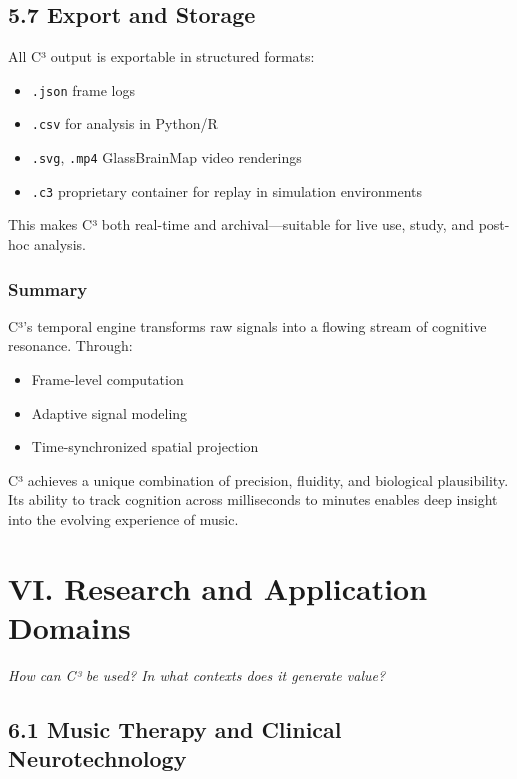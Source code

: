 \documentclass[10pt]{article}
\begin{document}
\subsection*{5.7 Export and Storage}

All C³ output is exportable in structured formats:

\begin{itemize}
    \item \texttt{.json} frame logs
    \item \texttt{.csv} for analysis in Python/R
    \item \texttt{.svg}, \texttt{.mp4} GlassBrainMap video renderings
    \item \texttt{.c3} proprietary container for replay in simulation environments
\end{itemize}

This makes C³ both real-time and archival—suitable for live use, study, and post-hoc analysis.

\subsubsection*{Summary}

C³'s temporal engine transforms raw signals into a flowing stream of cognitive resonance. Through:

\begin{itemize}
    \item Frame-level computation
    \item Adaptive signal modeling
    \item Time-synchronized spatial projection
\end{itemize}

C³ achieves a unique combination of precision, fluidity, and biological plausibility. Its ability to track cognition across milliseconds to minutes enables deep insight into the evolving experience of music.

\section*{VI. Research and Application Domains}

\textit{How can C³ be used? In what contexts does it generate value?}

\subsection*{6.1 Music Therapy and Clinical Neurotechnology}
\end{document}
